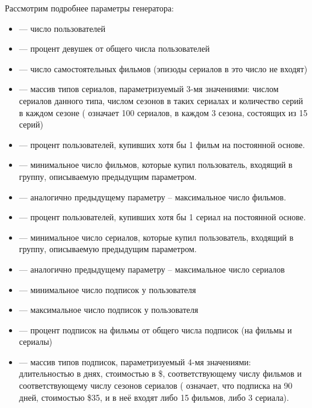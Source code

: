 

Рассмотрим подробнее параметры генератора:

\begin{itemize}
	\item {} --- число пользователей
	\item {} --- процент девушек от общего числа пользователей
	\item {} --- число самостоятельных фильмов (эпизоды сериалов в это число не входят)
	\item {} --- массив типов сериалов, параметризуемый 3-мя значениями: числом сериалов данного типа, числом сезонов в таких сериалах и количество серий в каждом сезоне (\code{[100, 3, 15]} означает 100 сериалов, в каждом 3 сезона, состоящих из 15 серий)
	\item {} --- процент пользователей, купивших хотя бы 1 фильм на постоянной основе.
	\item {} --- минимальное число фильмов, которые купил пользователь, входящий в группу, описываемую предыдущим параметром.
	\item {} --- аналогично предыдущему параметру -- максимальное число фильмов.
	\item {} --- процент пользователей, купивших хотя бы 1 сериал на постоянной основе.
	\item {} --- минимальное число сериалов, которые купил пользователь, входящий в группу, описываемую предыдущим параметром.
	\item {} --- аналогично предыдущему параметру -- максимальное число сериалов
	\item {} --- минимальное число подписок у пользователя
	\item {} --- максимальное число подписок у пользователя
	\item {} --- процент подписок на фильмы от общего числа подписок (на фильмы и сериалы)
	\item {} --- массив типов подписок, параметризуемый 4-мя значениями: длительностью в днях, стоимостью в \$, соответствующему числу фильмов и соответствующему числу сезонов сериалов (\code{[90, 35, 15, 3]} означает, что подписка на 90 дней, стоимостью \$35, и в неё входят либо 15 фильмов, либо 3 сериала).



\end{itemize}
